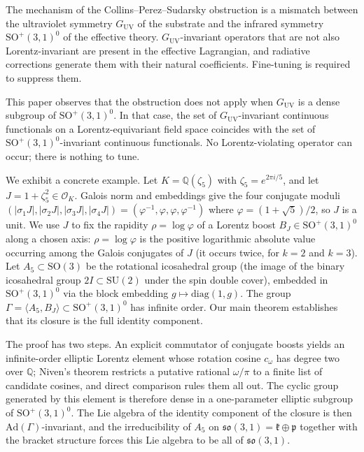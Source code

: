 \documentclass[11pt]{article}
\theoremstyle{remark}
\begin{document}
The mechanism of the Collins--Perez--Sudarsky obstruction is a mismatch
between the ultraviolet symmetry $G_{\mathrm{UV}}$ of the substrate
and the infrared symmetry $\mathrm{SO}^+(3,1)^0$ of the effective
theory. $G_{\mathrm{UV}}$-invariant operators that are not also
Lorentz-invariant are present in the effective Lagrangian, and
radiative corrections generate them with their natural coefficients.
Fine-tuning is required to suppress them.

This paper observes that the obstruction does not apply when
$G_{\mathrm{UV}}$ is a dense subgroup of $\mathrm{SO}^+(3,1)^0$. In
that case, the set of $G_{\mathrm{UV}}$-invariant continuous
functionals on a Lorentz-equivariant field space coincides with the
set of $\mathrm{SO}^+(3,1)^0$-invariant continuous functionals. No
Lorentz-violating operator can occur; there is nothing to tune.

We exhibit a concrete example. Let $K = \mathbb{Q}(\zeta_5)$ with
$\zeta_5 = e^{2\pi i/5}$, and let $J = 1 + \zeta_5^2 \in
\mathcal{O}_K$. Galois norm and embeddings give the four conjugate
moduli $(|\sigma_1 J|, |\sigma_2 J|, |\sigma_3 J|, |\sigma_4 J|) =
(\varphi^{-1}, \varphi, \varphi, \varphi^{-1})$ where $\varphi =
(1+\sqrt{5})/2$, so $J$ is a unit. We use $J$ to fix the rapidity
$\rho = \log\varphi$ of a Lorentz boost $B_J \in \mathrm{SO}^+(3,1)^0$
along a chosen axis: $\rho = \log\varphi$ is the positive
logarithmic absolute value occurring among the Galois conjugates of
$J$ (it occurs twice, for $k = 2$ and $k = 3$). Let $A_5 \subset \mathrm{SO}(3)$ be the
rotational icosahedral group (the image of the binary icosahedral
group $2I \subset \mathrm{SU}(2)$ under the spin double cover), embedded
in $\mathrm{SO}^+(3,1)^0$ via the block embedding $g \mapsto
\mathrm{diag}(1, g)$. The group $\Gamma = \langle A_5, B_J\rangle
\subset \mathrm{SO}^+(3,1)^0$ has infinite order. Our main theorem
establishes that its closure is the full identity component.

The proof has two steps. An explicit commutator of conjugate boosts
yields an infinite-order elliptic Lorentz element whose rotation
cosine $c_\omega$ has degree two over $\mathbb{Q}$; Niven's theorem
restricts a putative rational $\omega/\pi$ to a finite list of
candidate cosines, and direct comparison rules them all out. The
cyclic group generated by this element is therefore dense in a
one-parameter elliptic subgroup of $\mathrm{SO}^+(3,1)^0$. The Lie
algebra of the identity component of the closure is then
$\mathrm{Ad}(\Gamma)$-invariant, and the irreducibility of $A_5$ on
$\mathfrak{so}(3,1) = \mathfrak{k} \oplus \mathfrak{p}$ together with
the bracket structure forces this Lie algebra to be all of
$\mathfrak{so}(3,1)$.
\end{document}
